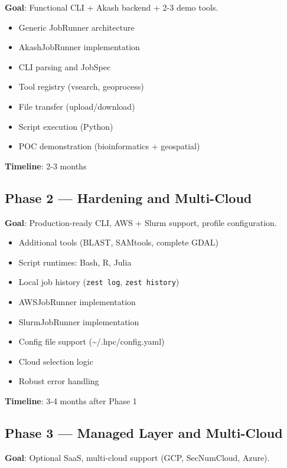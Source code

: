 \documentclass[11pt,a4paper]{article}
\begin{document}
	\textbf{Goal}: Functional CLI + Akash backend + 2-3 demo tools.
	
	\begin{itemize}
		\item[$\checkmark$] Generic JobRunner architecture
		\item[$\checkmark$] AkashJobRunner implementation
		\item[$\checkmark$] CLI parsing and JobSpec
		\item[$\checkmark$] Tool registry (vsearch, geoprocess)
		\item[$\checkmark$] File transfer (upload/download)
		\item[$\checkmark$] Script execution (Python)
		\item[\,-] POC demonstration (bioinformatics + geospatial)
	\end{itemize}
	
	\textbf{Timeline}: 2-3 months
	
	\subsection{Phase 2 --- Hardening and Multi-Cloud}
	
	\textbf{Goal}: Production-ready CLI, AWS + Slurm support, profile configuration.
	
	\begin{itemize}
		\item[\,-] Additional tools (BLAST, SAMtools, complete GDAL)
		\item[\,-] Script runtimes: Bash, R, Julia
		\item[\,-] Local job history (\texttt{zest log}, \texttt{zest history})
		\item[\,-] AWSJobRunner implementation
		\item[\,-] SlurmJobRunner implementation
		\item[\,-] Config file support (\textasciitilde/.hpc/config.yaml)
		\item[\,-] Cloud selection logic
		\item[\,-] Robust error handling
	\end{itemize}
	
	\textbf{Timeline}: 3-4 months after Phase 1
	
	\subsection{Phase 3 --- Managed Layer and Multi-Cloud}
	
	\textbf{Goal}: Optional SaaS, multi-cloud support (GCP, SecNumCloud, Azure).
	
\end{document}
